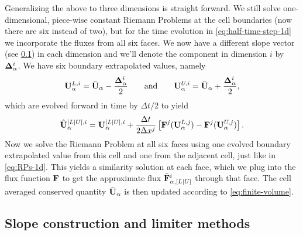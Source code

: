 \documentclass{article}
\begin{document}
Generalizing the above to three dimensions is straight forward. We still solve one-dimensional,
piece-wise constant Riemann Problems at the cell boundaries (now there are six instead of two), but
for the time evolution in \cref{eq:half-time-step-1d} we incorporate the fluxes from all six faces.
We now have a different slope vector (see \cref{sec:slope}) in each dimension and we'll denote the
component in dimension $i$ by $\mathrm{\bf \Delta}_\alpha^i$. We have six boundary extrapolated values,
namely
\begin{align}
  \label{eq:boundary-values-3d}
  \mathrm{\bf U}_\alpha^{L,i} = \bar{\mathrm{\bf U}}_\alpha - \frac{\mathrm{\bf \Delta}_\alpha^i}{2}
  \qquad \text{and} \qquad
  \mathrm{\bf U}_\alpha^{U,i} = \bar{\mathrm{\bf U}}_\alpha + \frac{\mathrm{\bf \Delta}_\alpha^i}{2},
\end{align}
which are evolved forward in time by $\Delta t/2$ to yield
\begin{align}
  \label{eq:evolved-boundary-values-3d}
  \hat{\mathrm{\bf U}}_\alpha^{[L|U],i} = \mathrm{\bf U}_\alpha^{[L|U],i} + \frac{\Delta t}{2\Delta x^j}
      \left[\mathrm{\bf F}^j(\mathrm{\bf U}_\alpha^{L,j}) - \mathrm{\bf F}^j(\mathrm{\bf U}_\alpha^{U,j})\right].
\end{align}
Now we solve the Riemann Problem at all six faces using one evolved boundary extrapolated value from
this cell and one from the adjacent cell, just like in \cref{eq:RPs-1d}. This yields a similarity
solution at each face, which we plug into the flux function $\mathrm{\bf F}$ to get the approximate flux
$\bar{\mathrm{\bf F}}^i_{\alpha,[L|U]}$
through that face. The cell averaged conserved quantity $\bar{\mathrm{\bf U}}_\alpha$ is then updated
according to \cref{eq:finite-volume}.


\subsection{Slope construction and limiter methods}\label{sec:slope}

\newcommand{\du}{\vc\Delta_\alpha^\text{up}}
\newcommand{\dd}{\vc\Delta_\alpha^\text{down}}
\newcommand{\dc}{\vc\Delta_\alpha^\text{cent}}
\newcommand{\db}{\bar{\vc\Delta}_\alpha}
\end{document}
